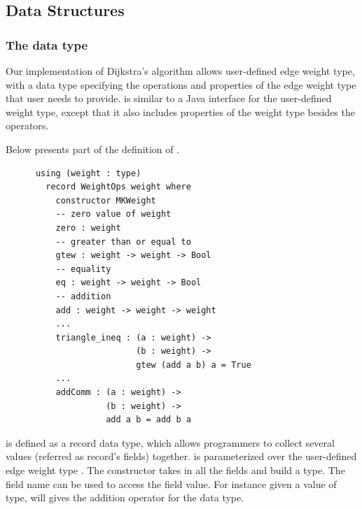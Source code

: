 \subsection{Data Structures} \label{code_structs}
\subsubsection{The  data type}
Our implementation of Dijkstra's algorithm allows user-defined edge weight type, with a  data type specifying the operations and properties of the edge weight type that user needs to provide.  is similar to a Java interface for the user-defined weight type, except that it also includes properties of the weight type besides the operators. 

Below presents part of the definition of . 
\begin{lstlisting}
      using (weight : type)
        record WeightOps weight where
          constructor MKWeight
          -- zero value of weight
          zero : weight
          -- greater than or equal to
          gtew : weight -> weight -> Bool
          -- equality
          eq : weight -> weight -> Bool
          -- addition
          add : weight -> weight -> weight
          ...
          triangle_ineq : (a : weight) -> 
                          (b : weight) -> 
                          gtew (add a b) a = True
          ...
          addComm : (a : weight) -> 
                    (b : weight) -> 
                    add a b = add b a
\end{lstlisting}

 is defined as a record data type, which allows programmers to collect several values (referred as record's fields) together.  is parameterized over the user-defined edge weight type . The  constructor takes in all the fields and build a  type. The field name can be used to access the field value. For instance given a value  of  type,  will gives the addition operator for the  data type. 
\\

